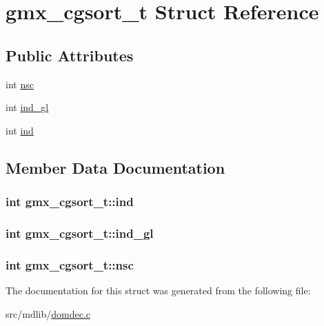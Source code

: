 \hypertarget{structgmx__cgsort__t}{\section{gmx\-\_\-cgsort\-\_\-t \-Struct \-Reference}
\label{structgmx__cgsort__t}
}
\subsection*{\-Public \-Attributes}
\begin{DoxyCompactItemize}
\item 
int \hyperlink{structgmx__cgsort__t_a084cb5ec2e55b24636380178bb30aeff}{nsc}
\item 
int \hyperlink{structgmx__cgsort__t_a582cca8f5e5104f4e8e900798f32c0b8}{ind\-\_\-gl}
\item 
int \hyperlink{structgmx__cgsort__t_a16d9216f86c354e32386086e91375a50}{ind}
\end{DoxyCompactItemize}


\subsection{\-Member \-Data \-Documentation}
\hypertarget{structgmx__cgsort__t_a16d9216f86c354e32386086e91375a50}{
\subsubsection[{ind}]{\setlength{\rightskip}{0pt plus 5cm}int {\bf gmx\-\_\-cgsort\-\_\-t\-::ind}}}\label{structgmx__cgsort__t_a16d9216f86c354e32386086e91375a50}
\hypertarget{structgmx__cgsort__t_a582cca8f5e5104f4e8e900798f32c0b8}{
\subsubsection[{ind\-\_\-gl}]{\setlength{\rightskip}{0pt plus 5cm}int {\bf gmx\-\_\-cgsort\-\_\-t\-::ind\-\_\-gl}}}\label{structgmx__cgsort__t_a582cca8f5e5104f4e8e900798f32c0b8}
\hypertarget{structgmx__cgsort__t_a084cb5ec2e55b24636380178bb30aeff}{
\subsubsection[{nsc}]{\setlength{\rightskip}{0pt plus 5cm}int {\bf gmx\-\_\-cgsort\-\_\-t\-::nsc}}}\label{structgmx__cgsort__t_a084cb5ec2e55b24636380178bb30aeff}


\-The documentation for this struct was generated from the following file\-:\begin{DoxyCompactItemize}
\item 
src/mdlib/\hyperlink{domdec_8c}{domdec.\-c}\end{DoxyCompactItemize}
